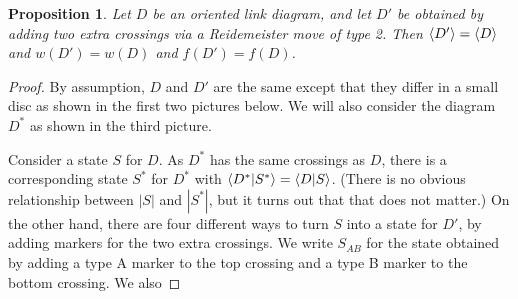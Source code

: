 \documentclass[reqno]{amsart}
\newtheorem{proposition}[theorem]{Proposition}
\theoremstyle{definition}
\begin{document}
\begin{proposition}\label{prop-Rii-invariant}
 Let $D$ be an oriented link diagram, and let $D'$ be obtained by
 adding two extra crossings via a Reidemeister move of type 2.  Then
 $\langle D'\rangle=\langle D\rangle$ and $w(D')=w(D)$ and $f(D')=f(D)$.
\end{proposition}
\begin{proof}
 By assumption, $D$ and $D'$ are the same except that they differ in a
 small disc as shown in the first two pictures below.  We will also
 consider the diagram $D^*$ as shown in the third picture. 
 \begin{center}
 \end{center}
 Consider a state $S$ for $D$.  As $D^*$ has the same crossings as
 $D$, there is a corresponding state $S^*$ for $D^*$ with
 $\langle D^*|S^*\rangle=\langle D|S\rangle$.  (There is no obvious relationship between
 $|S|$ and $|S^*|$, but it turns out that that does not matter.)  On
 the other hand, there are four different ways to turn $S$ into a
 state for $D'$, by adding markers for the two extra crossings.  We
 write $S_{AB}$ for the state obtained by adding a type A marker to
 the top crossing and a type B marker to the bottom crossing.  We also

\end{proof}
\end{document}
